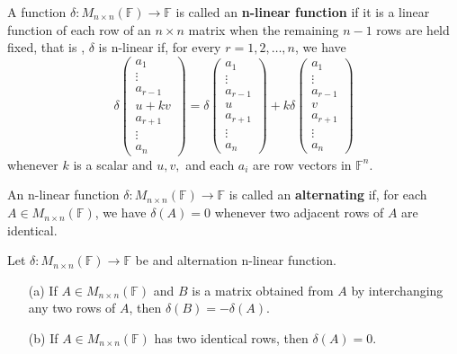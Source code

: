 \begin{definition}
    A function \(\delta: M_{n \times n}(\mathbb{F}) \to \mathbb{F}\) is called an \textbf{n-linear function} if it is a linear function of each row of an \( n \times n \) matrix when the remaining \( n-1\) rows are held fixed, that is , \(\delta\) is n-linear if, for every \(r=1,2,\dots ,n\), we have
    \[
    \delta \begin{pmatrix} a_1 \\ \vdots \\ a_{r-1} \\ u + kv \\ a_{r+1} \\ \vdots \\ a_n \end{pmatrix}
    = \delta \begin{pmatrix} a_1 \\ \vdots \\ a_{r-1} \\ u \\ a_{r+1} \\ \vdots \\ a_n \end{pmatrix}
    + k \delta \begin{pmatrix} a_1 \\ \vdots \\ a_{r-1} \\ v \\ a_{r+1} \\ \vdots \\ a_n \end{pmatrix}
    \]
    whenever \(k\) is a scalar and \(u, v,\) and each \(a_i\) are row vectors in \(\mathbb{F}^n\).
\end{definition}
\begin{definition}
    An n-linear function \(\delta: M_{n \times n}(\mathbb{F}) \to \mathbb{F}\) is called an \textbf{alternating} if, for each \(A \in M_{n \times n}(\mathbb{F})\), we have \(\delta(A) = 0\) whenever two adjacent rows of \(A\) are identical.
\end{definition}
\begin{theorem}
    Let \(\delta: M_{n \times n}(\mathbb{F}) \to \mathbb{F}\) be and alternation n-linear function.
    \begin{enumerate}
        \item[(a)] If \(A \in M_{n \times n}(\mathbb{F})\) and \(B\) is a matrix obtained from \(A\) by interchanging any two rows of \(A\), then \(\delta(B) = - \delta(A)\).
        \item[(b)] If \(A \in M_{n \times n}(\mathbb{F})\) has two identical rows, then \(\delta(A) = 0 \). 
    \end{enumerate}
\end{theorem}
